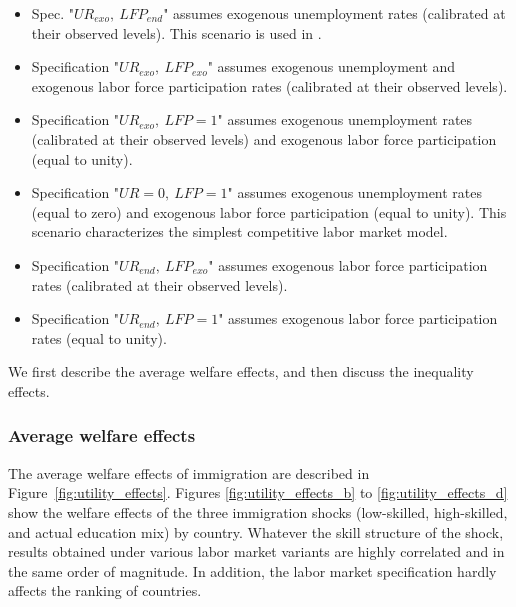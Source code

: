 \documentclass[a4paper,12pt]{article}
\begin{document}
\begin{itemize}
\item Spec. "$UR_{exo},~LFP_{end}$" assumes exogenous unemployment rates (calibrated at their observed levels). This scenario is used in \citet{Burzynski2018}.
\item Specification "$UR_{exo},~LFP_{exo}$" assumes exogenous unemployment and exogenous labor force participation rates (calibrated at their observed levels).
\item Specification "$UR_{exo},~LFP=1$" assumes exogenous unemployment rates (calibrated at their observed levels) and exogenous labor force
participation (equal to unity).
\item Specification "$UR=0,~LFP=1$" assumes exogenous unemployment rates (equal to zero) and exogenous labor force participation (equal to unity). This scenario characterizes the simplest competitive labor market model.
\item Specification "$UR_{end},~LFP_{exo}$" assumes exogenous labor force participation rates (calibrated at their observed levels).
\item Specification "$UR_{end},~LFP=1$" assumes exogenous labor force participation rates (equal to unity). %
\end{itemize}

We first describe the average welfare effects, and then discuss the inequality effects.

\subsubsection{Average welfare effects}

The average welfare effects of immigration are described in Figure~\ref{fig:utility_effects}. Figures \ref{fig:utility_effects_b} to \ref{fig:utility_effects_d} show the welfare effects of the three immigration shocks (low-skilled, high-skilled, and actual education mix) by country. Whatever the skill structure of the shock, results obtained under various labor market variants are highly correlated and in the same order of magnitude. In addition, the labor market specification hardly affects the ranking of countries. 
\end{document}

